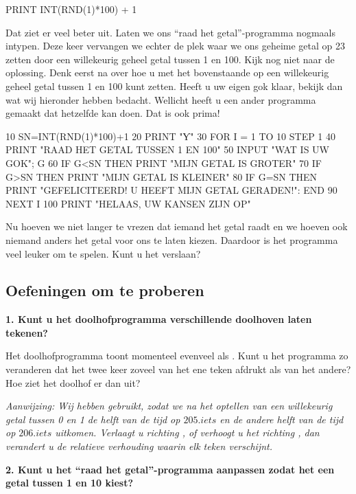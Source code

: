 \begin{screencode}
  PRINT INT(RND(1)*100) + 1
\end{screencode}

\needspace{3cm}
Dat ziet er veel beter uit. Laten we ons ``raad het getal''-programma nogmaals intypen. Deze keer vervangen we echter de plek waar we ons geheime getal op 23 zetten door een willekeurig geheel getal tussen 1 en 100. Kijk nog niet naar de oplossing. Denk eerst na over hoe u met het bovenstaande  op een willekeurig geheel getal tussen 1 en 100 kunt zetten. Heeft u uw eigen gok klaar, bekijk dan wat wij hieronder hebben bedacht. Wellicht heeft u een ander programma gemaakt dat hetzelfde kan doen. Dat is ook prima!

\begin{screencode}
10 SN=INT(RND(1)*100)+1
20 PRINT "Ƴ"
30 FOR I = 1 TO 10 STEP 1
40 PRINT "RAAD HET GETAL TUSSEN 1 EN 100"
50 INPUT "WAT IS UW GOK"; G
60 IF G<SN THEN PRINT "MIJN GETAL IS GROTER"
70 IF G>SN THEN PRINT "MIJN GETAL IS KLEINER"
80 IF G=SN THEN PRINT "GEFELICITEERD! U HEEFT MIJN GETAL GERADEN!": END
90 NEXT I
100 PRINT "HELAAS, UW KANSEN ZIJN OP"
\end{screencode}

Nu hoeven we niet langer te vrezen dat iemand het getal raadt en we hoeven ook niemand anders het getal voor ons te laten kiezen. Daardoor is het programma veel leuker om te spelen. Kunt u het verslaan?


\subsection{Oefeningen om te proberen}

{\bf 1. Kunt u het doolhofprogramma verschillende doolhoven laten tekenen?}

Het doolhofprogramma toont momenteel evenveel {} als {}. Kunt u het programma zo veranderen dat het twee keer zoveel van het ene teken afdrukt als van het andere? Hoe ziet het doolhof er dan uit?

{\em Aanwijzing: Wij hebben  gebruikt, zodat we na het optellen van een willekeurig getal tussen 0 en 1 de helft van de tijd op $205.iets$ en de andere helft van de tijd op $206.iets$ uitkomen. Verlaagt u  richting , of verhoogt u het richting , dan verandert u de relatieve verhouding waarin elk teken verschijnt.}

{\bf 2. Kunt u het ``raad het getal''-programma aanpassen zodat het een getal tussen 1 en 10 kiest?}

